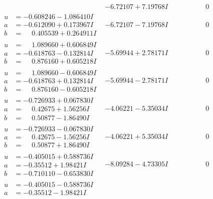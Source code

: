 \documentclass[1p]{elsarticle_modified}
\theoremstyle{definition}
\begin{document}
$$\begin{array}{c|c|c}
 & -6.72107 + 7.19768 I & \phantom{-0.000000 } 0 \\ \hline\begin{aligned}
u &= -0.608246 - 1.086410 I \\
a &= -0.612090 + 0.173967 I \\
b &= \phantom{-}0.405539 + 0.264911 I\end{aligned}
 & -6.72107 - 7.19768 I & \phantom{-0.000000 } 0 \\ \hline\begin{aligned}
u &= \phantom{-}1.089660 + 0.606849 I \\
a &= -0.618763 - 0.132814 I \\
b &= \phantom{-}0.876160 + 0.605218 I\end{aligned}
 & -5.69944 + 2.78171 I & \phantom{-0.000000 } 0 \\ \hline\begin{aligned}
u &= \phantom{-}1.089660 - 0.606849 I \\
a &= -0.618763 + 0.132814 I \\
b &= \phantom{-}0.876160 - 0.605218 I\end{aligned}
 & -5.69944 - 2.78171 I & \phantom{-0.000000 } 0 \\ \hline\begin{aligned}
u &= -0.726933 + 0.067830 I \\
a &= \phantom{-}0.42675 + 1.56256 I \\
b &= \phantom{-}0.50877 - 1.86490 I\end{aligned}
 & -4.06221 - 5.35034 I & \phantom{-0.000000 } 0 \\ \hline\begin{aligned}
u &= -0.726933 - 0.067830 I \\
a &= \phantom{-}0.42675 - 1.56256 I \\
b &= \phantom{-}0.50877 + 1.86490 I\end{aligned}
 & -4.06221 + 5.35034 I & \phantom{-0.000000 } 0 \\ \hline\begin{aligned}
u &= -0.405015 + 0.588736 I \\
a &= -0.35512 + 1.98421 I \\
b &= -0.710110 - 0.653830 I\end{aligned}
 & -8.09284 - 4.73305 I & \phantom{-0.000000 } 0 \\ \hline\begin{aligned}
u &= -0.405015 - 0.588736 I \\
a &= -0.35512 - 1.98421 I \\

\end{aligned}
\end{array}$$
\end{document}
